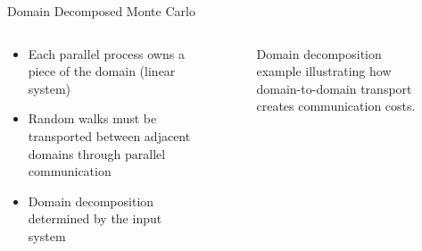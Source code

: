 \documentclass{beamer}
\begin{document}
\begin{frame}{Domain Decomposed Monte Carlo}

  \begin{columns}
    \begin{column}{0.5\textwidth}
      \begin{itemize}
      \item Each parallel process owns a piece of the domain (linear
        system)
        \bigskip
      \item Random walks must be transported between adjacent domains
        through parallel communication
        \bigskip
      \item Domain decomposition determined by the input system
      \end{itemize}
    \end{column}

    \begin{column}{0.5\textwidth}
      \begin{figure}[htpb!]
        \begin{center}
          \scalebox{0.75}{  }
        \end{center}
        \caption{\small Domain decomposition example illustrating
          how domain-to-domain transport creates communication costs.}
      \end{figure}
    \end{column}
  \end{columns}

\end{frame}
\end{document}
